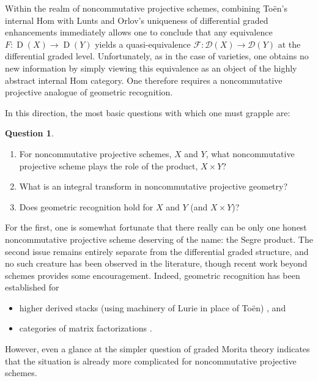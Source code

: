 \documentclass[12pt]{amsart}
\theoremstyle{definition}
\newtheorem*{question*}{Question}
\begin{document}
Within the realm of noncommutative projective schemes, combining To\"en's internal Hom with Lunts and Orlov's uniqueness of differential graded enhancements immediately allows one to conclude that any equivalence \(F \colon \operatorname{D}(X) \to \operatorname{D}(Y)\) yields a quasi-equivalence \(\mathcal{F} \colon \mathcal{D}(X) \to \mathcal{D}(Y)\) at the differential graded level.
Unfortunately, as in the case of varieties, one obtains no new information by simply viewing this equivalence as an object of the highly abstract internal Hom category.
One therefore requires a noncommutative projective analogue of geometric recognition.

In this direction, the most basic questions with which one must grapple are:
\begin{tcolorbox} 
  \begin{question*}\leavevmode
    \begin{enumerate}
      \item
        For noncommutative projective schemes, \(X\) and \(Y\), what noncommutative projective scheme plays the role of the product, \(X \times Y\)?
      \item
        What is an integral transform in noncommutative projective geometry?
      \item
        Does geometric recognition hold for \(X\) and \(Y\) (and \(X \times Y\))?
    \end{enumerate}
  \end{question*}
\end{tcolorbox}
For the first, one is somewhat fortunate that there really can be only one honest noncommutative projective scheme deserving of the name: the Segre product.
The second issue remains entirely separate from the differential graded structure, and no such creature has been observed in the literature, though recent work beyond schemes provides some encouragement.
Indeed, geometric recognition has been established for
\begin{itemize}
\item
  higher derived stacks (using machinery of Lurie in place of To\"en) \cite{BFN}, and
\item
  categories of matrix factorizations \cite{dyck,PV,BFK}.
\end{itemize}
However, even a glance at the simpler question of graded Morita theory \cite{Zhang} indicates that the situation is already more complicated for noncommutative projective schemes.
\end{document}
